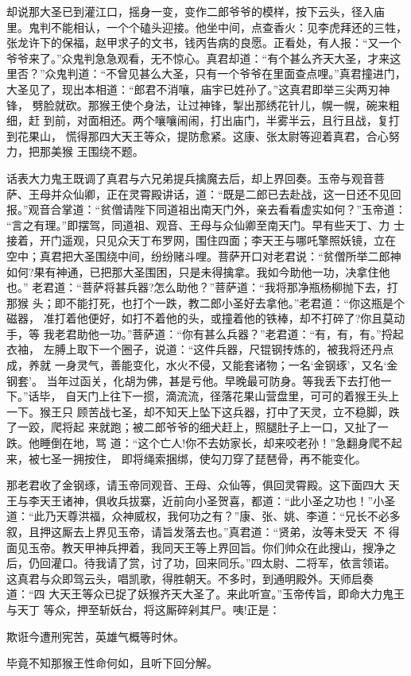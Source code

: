 却说那大圣已到灌江口，摇身一变，变作二郎爷爷的模样，按下云头，径入庙
里。鬼判不能相认，一个个磕头迎接。他坐中间，点查香火：见李虎拜还的三牲，
张龙许下的保福，赵甲求子的文书，钱丙告病的良愿。正看处，有人报：“又一个
爷爷来了。”众鬼判急急观看，无不惊心。真君却道：“有个甚么齐天大圣，才来这
里否？”众鬼判道：“不曾见甚么大圣，只有一个爷爷在里面查点哩。”真君撞进门，
大圣见了，现出本相道：“郎君不消嚷，庙宇已姓孙了。”这真君即举三尖两刃神锋，
劈脸就砍。那猴王使个身法，让过神锋，掣出那绣花针儿，幌一幌，碗来粗细，赶
到前，对面相还。两个嚷嚷闹闹，打出庙门，半雾半云，且行且战，复打到花果山，
慌得那四大天王等众，提防愈紧。这康、张太尉等迎着真君，合心努力，把那美猴
王围绕不题。

话表大力鬼王既调了真君与六兄弟提兵擒魔去后，却上界回奏。玉帝与观音菩
萨、王母并众仙卿，正在灵霄殿讲话，道：“既是二郎已去赴战，这一日还不见回
报。”观音合掌道：“贫僧请陛下同道祖出南天门外，亲去看看虚实如何？”玉帝道：
“言之有理。”即摆驾，同道祖、观音、王母与众仙卿至南天门。早有些天丁、力
士接着，开门遥观，只见众天丁布罗网，围住四面；李天王与哪吒擎照妖镜，立在
空中；真君把大圣围绕中间，纷纷赌斗哩。菩萨开口对老君说：“贫僧所举二郎神
如何?果有神通，已把那大圣围困，只是未得擒拿。我如今助他一功，决拿住他也。”
老君道：“菩萨将甚兵器?怎么助他？”菩萨道：“我将那净瓶杨柳抛下去，打那猴
头；即不能打死，也打个一跌，教二郎小圣好去拿他。”老君道：“你这瓶是个磁器，
准打着他便好，如打不着他的头，或撞着他的铁棒，却不打碎了?你且莫动手，等
我老君助他一功。”菩萨道：“你有甚么兵器？”老君道：“有，有，有。”捋起衣袖，
左膊上取下一个圈子，说道：“这件兵器，尺锟钢抟炼的，被我将还丹点成，养就
一身灵气，善能变化，水火不侵，又能套诸物；一名‘金钢琢’，又名‘金钢套’。
当年过函关，化胡为佛，甚是亏他。早晚最可防身。等我丢下去打他一下。”话毕，
自天门上往下一掼，滴流流，径落花果山营盘里，可可的着猴王头上一下。猴王只
顾苦战七圣，却不知天上坠下这兵器，打中了天灵，立不稳脚，跌了一跤，爬将起
来就跑；被二郎爷爷的细犬赶上，照腿肚子上一口，又扯了一跌。他睡倒在地，骂
道：“这个亡人!你不去妨家长，却来咬老孙！”急翻身爬不起来，被七圣一拥按住，
即将绳索捆绑，使勾刀穿了琵琶骨，再不能变化。

那老君收了金钢琢，请玉帝同观音、王母、众仙等，俱回灵霄殿。这下面四大
天王与李天王诸神，俱收兵拔寨，近前向小圣贺喜，都道：“此小圣之功也！”小圣
道：“此乃天尊洪福，众神威权，我何功之有？”康、张、姚、李道：“兄长不必多
叙，且押这厮去上界见玉帝，请旨发落去也。”真君道：“贤弟，汝等未受天，不
得面见玉帝。教天甲神兵押着，我同天王等上界回旨。你们帅众在此搜山，搜净之
后，仍回灌口。待我请了赏，讨了功，回来同乐。”四太尉、二将军，依言领诺。
这真君与众即驾云头，唱凯歌，得胜朝天。不多时，到通明殿外。天师启奏道：“四
大天王等众已捉了妖猴齐天大圣了。来此听宣。”玉帝传旨，即命大力鬼王与天丁
等众，押至斩妖台，将这厮碎剁其尸。咦!正是：

欺诳今遭刑宪苦，英雄气概等时休。

毕竟不知那猴王性命何如，且听下回分解。